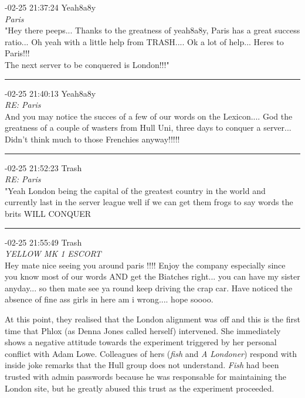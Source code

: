 \begin{mail}

{-02-25 21:37:24 Yeah8a8y}\\
{\itshape Paris}\\
"Hey there peeps... Thanks to the greatness of yeah8a8y, Paris has a great success ratio... Oh yeah with a little help from TRASH.... Ok a lot of help... Heres to Paris!!!\\
The next server to be conquered is London!!!"\\

\rule{0.8\textwidth}{.4pt}

{-02-25 21:40:13 Yeah8a8y}\\
{\itshape RE: Paris}\\
And you may notice the succes of a few of our words on the Lexicon.... God the greatness of a couple of wasters from Hull Uni, three days to conquer a server... Didn't think much to those Frenchies anyway!!!!!\\

\rule{0.8\textwidth}{.4pt}

{-02-25 21:52:23 Trash}\\
{\itshape RE: Paris}\\
"Yeah London being the capital of the greatest country in the world and currently last in the server league well if we can get them frogs to say words the brits WILL CONQUER\\

\rule{0.8\textwidth}{.4pt}

{-02-25 21:55:49 Trash}\\
{\itshape YELLOW MK 1 ESCORT}\\
Hey mate nice seeing you around paris !!!! Enjoy the company especially since you know most of our words AND get the Biatches right... you can have my sister anyday... so then mate see ya round keep driving the crap car.	
Have noticed the absence of fine ass girls in here am i wrong.... hope soooo.
\end{mail}

At this point, they realised that the London alignment was off and this is the first time that Phlox (as Denna 
Jones called herself) intervened. She immediately shows
a negative attitude towards the experiment triggered by her personal conflict with Adam Lowe. 
Colleagues of hers ({\it fish} and {\it A Londoner}) respond with inside joke
remarks that the Hull group does not understand. {\it Fish} had been trusted with admin passwords because he
was responsable for maintaining the London site, but he greatly abused this trust as the experiment proceeded. 

